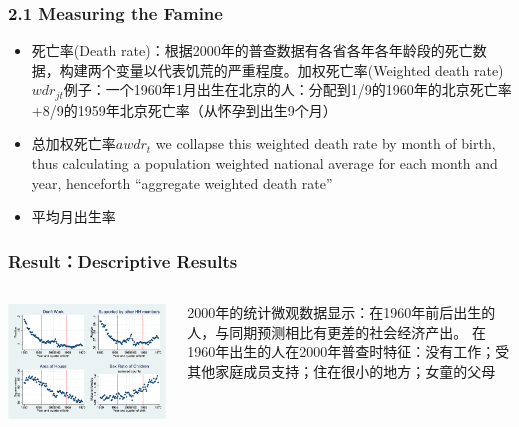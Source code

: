 \documentclass{beamer}
\begin{document}
\begin{frame}
	\frametitle{2.1 Measuring the Famine}
\begin{itemize}
	\item 死亡率(Death rate)：根据2000年的普查数据有各省各年各年龄段的死亡数据，构建两个变量以代表饥荒的严重程度。加权死亡率(Weighted death rate)$wdr_{jt}$例子：一个1960年1月出生在北京的人：分配到1/9的1960年的北京死亡率+8/9的1959年北京死亡率（从怀孕到出生9个月）
	\item 总加权死亡率$awdr_{t}$ we collapse this weighted death rate by month of birth, thus calculating a population weighted national average for each month and year, henceforth “aggregate weighted death rate” 
	\item 平均月出生率
\end{itemize}
\end{frame}


\begin{frame}
\frametitle{Result：Descriptive Results}
	\begin{columns}
            \begin{minipage}[c][0.4\textheight][c]{\linewidth}
                \centering
                \includegraphics[width=0.9\linewidth]{figure5}
            \end{minipage}
           
           	\begin{minipage}[c][0.4\textheight][c]{\linewidth}
            2000年的统计微观数据显示：在1960年前后出生的人，与同期预测相比有更差的社会经济产出。
            在1960年出生的人在2000年普查时特征：没有工作；受其他家庭成员支持；住在很小的地方；女童的父母
            \end{minipage}
    \end{columns}
\end{frame}
\end{document}
